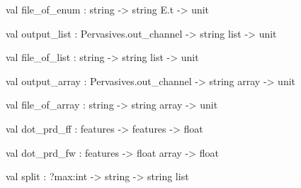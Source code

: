 \documentclass[11pt]{article}
\begin{document}
\label{val:Util.file-underscoreof-underscoreenum}\begin{ocamldoccode}
val file_of_enum : string -> string E.t -> unit
\end{ocamldoccode}




\label{val:Util.output-underscorelist}\begin{ocamldoccode}
val output_list : Pervasives.out_channel -> string list -> unit
\end{ocamldoccode}




\label{val:Util.file-underscoreof-underscorelist}\begin{ocamldoccode}
val file_of_list : string -> string list -> unit
\end{ocamldoccode}




\label{val:Util.output-underscorearray}\begin{ocamldoccode}
val output_array : Pervasives.out_channel -> string array -> unit
\end{ocamldoccode}




\label{val:Util.file-underscoreof-underscorearray}\begin{ocamldoccode}
val file_of_array : string -> string array -> unit
\end{ocamldoccode}




\label{val:Util.dot-underscoreprd-underscoreff}\begin{ocamldoccode}
val dot_prd_ff : features -> features -> float
\end{ocamldoccode}




\label{val:Util.dot-underscoreprd-underscorefw}\begin{ocamldoccode}
val dot_prd_fw : features -> float array -> float
\end{ocamldoccode}




\label{val:Util.split}\begin{ocamldoccode}
val split : ?max:int -> string -> string list
\end{ocamldoccode}
\end{document}
